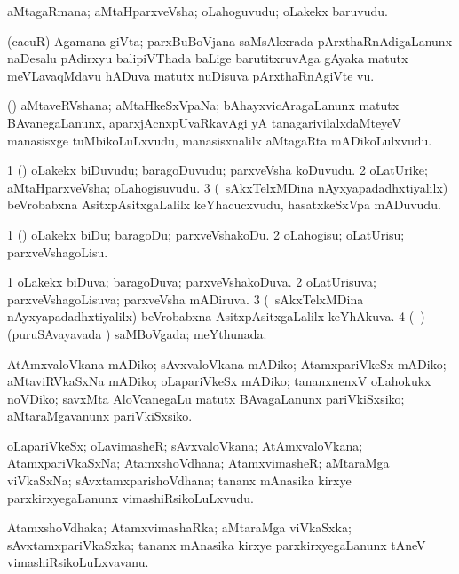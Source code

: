 \bentry
{}
\gl{\nA}
\bmng
aMtagaRmana; aMtaHparxveVsha; oLahoguvudu; oLakekx baruvudu. 
\emng
\eentry

\bentry
{}
\gl{\nA}
\bmng
(cacuR) Agamana giVta; parxBuBoVjana saMsAkxrada pArxthaRnAdigaLanunx naDesalu pAdirxyu balipiVThada baLige barutitxruvAga gAyaka matutx meVLavaqMdavu hADuva matutx nuDisuva pArxthaRnAgiVte \mo vu. 
\emng
\eentry

\bentry
{}
\gl{\nA}
\bmng
(\mashA) aMtaveRVshana; aMtaHkeSxVpaNa; bAhayxvicAragaLanunx matutx BAvanegaLanunx, aparxjAcnxpUvaRkavAgi yA tanagarivilalxdaMteyeV manasisxge tuMbikoLuLxvudu, manasisxnalilx aMtagaRta mADikoLulxvudu. 
\emng
\eentry

\bentry
{}
\gl{\nA}
\bmng
\bnum
\num{1} (\pArxparx) oLakekx biDuvudu; baragoDuvudu; parxveVsha koDuvudu. 
\num{2} oLatUrike; aMtaHparxveVsha; oLahogisuvudu. 
\num{3} (\kanmu\ sAkxTelxMDina nAyxyapadadhxtiyalilx) beVrobabxna AsitxpAsitxgaLalilx keYhacucxvudu, hasatxkeSxVpa mADuvudu. 
\enum
\emng
\eentry

\bentry
{}
\gl{\sakirx}
\bmng
\bnum
\num{1} (\pArxparx) oLakekx biDu; baragoDu; parxveVshakoDu. 
\num{2} oLahogisu; oLatUrisu; parxveVshagoLisu. 
\enum
\emng
\eentry

\bentry
{}
\gl{\nA}
\bmng
\bnum
\num{1} oLakekx biDuva; baragoDuva; parxveVshakoDuva. 
\num{2} oLatUrisuva; parxveVshagoLisuva; parxveVsha mADiruva. 
\num{3} (\kanmu\ sAkxTelxMDina nAyxyapadadhxtiyalilx) beVrobabxna AsitxpAsitxgaLalilx keYhAkuva. 
\num{4} (\kanmu\ \jiVvi) (puruSAvayavada \vi) saMBoVgada; meYthunada. 
\enum
\emng
\eentry

\bentry
{}
\gl{\sakirx}
\bmng
AtAmxvaloVkana mADiko; sAvxvaloVkana mADiko; AtamxpariVkeSx mADiko; aMtaviRVkaSxNa mADiko; oLapariVkeSx mADiko; tananxnenxV oLahokukx noVDiko; savxMta AloVcanegaLu matutx BAvagaLanunx pariVkiSxsiko; aMtaraMgavanunx pariVkiSxsiko. 
\emng
\eentry

\bentry
{}
\gl{\nA}
\bmng
oLapariVkeSx; oLavimasheR; sAvxvaloVkana; AtAmxvaloVkana; AtamxpariVkaSxNa; AtamxshoVdhana; AtamxvimasheR; aMtaraMga viVkaSxNa; sAvxtamxparishoVdhana; tananx mAnasika kirxye parxkirxyegaLanunx vimashiRsikoLuLxvudu. 
\emng
\eentry

\bentry
{}
\gl{\nA}
\bmng
AtamxshoVdhaka; AtamxvimashaRka; aMtaraMga viVkaSxka; sAvxtamxpariVkaSxka; tananx mAnasika kirxye parxkirxyegaLanunx tAneV vimashiRsikoLuLxvavanu. 
\emng
\eentry

